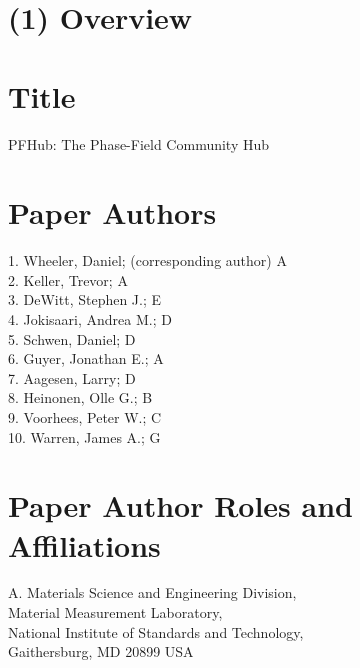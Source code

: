\documentclass{jors}
\begin{document}
\newcommand\githublink[1]{\href{https://github.com/#1/}{\texttt{\textbf{@#1}}}}




\section*{(1) Overview}

\vspace{0.5cm}

\section*{Title}

PFHub: The Phase-Field Community Hub

\section*{Paper Authors}

1. Wheeler, Daniel; (corresponding author) A\\
2. Keller, Trevor; A\\
3. DeWitt, Stephen J.; E\\
4. Jokisaari, Andrea M.; D\\
5. Schwen, Daniel; D\\
6. Guyer, Jonathan E.; A\\
7. Aagesen, Larry; D\\
8. Heinonen, Olle G.; B\\
9. Voorhees, Peter W.; C\\
10. Warren, James A.; G

\section*{Paper Author Roles and Affiliations}

A. Materials Science and Engineering Division, \\
Material Measurement Laboratory, \\
National Institute of Standards and Technology,\\
Gaithersburg, MD 20899 USA
\end{document}
